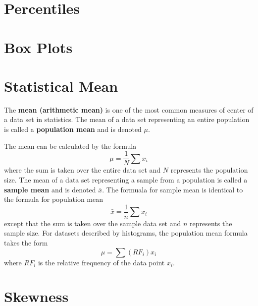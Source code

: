 \documentclass{article}
\theoremstyle{definition}
\begin{document}
\section{Percentiles}

\section{Box Plots}

\section{Statistical Mean}
\begin{definition}
    The \textbf{mean (arithmetic mean)} is one of the most common measures of 
    center of a data set in statistics. The mean of a data set representing an 
    entire population is called a \textbf{population mean} and is denoted $\mu$. 
\end{definition}
\noindent The mean can be calculated by the formula 
\[
    \mu = \frac{1}{N}\sum x_i  
\]
where the sum is taken over the entire data set and $N$ represents the
population size. The mean of a data set representing a sample from a population 
is called a \textbf{sample mean} and is denoted $\bar{x}$. The formuala for 
sample mean is identical to the formula for population mean 
\[
    \bar{x} = \frac{1}{n}\sum x_i
\]
except that the sum is taken over the sample data set and $n$ represents the
sample size. For datasets described by histograms, the population mean formula
takes the form
\[
    \mu = \sum (RF_i) x_i
\]
where $RF_i$ is the relative frequency of the data point $x_i$.

\section{Skewness}
\end{document}
